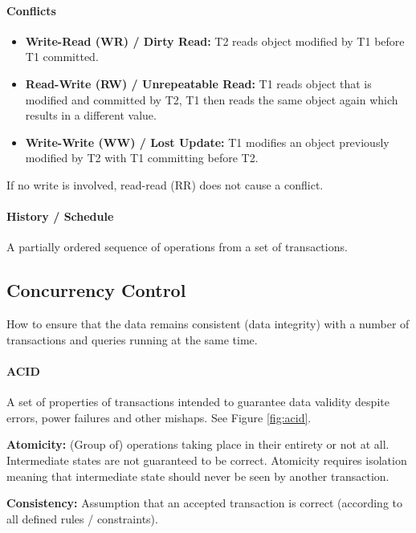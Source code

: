 
\paragraph{Conflicts}
\begin{itemize}
    \item \textbf{Write-Read (WR) / Dirty Read:} T2 reads object modified by T1 before T1 committed.
    \item \textbf{Read-Write (RW) / Unrepeatable Read:} T1 reads object that is modified and committed by T2, T1 then reads the same object again which results in a different value.
    \item \textbf{Write-Write (WW) / Lost Update:} T1 modifies an object previously modified by T2 with T1 committing before T2.
\end{itemize} 
If no write is involved, read-read (RR) does not cause a conflict.


\paragraph{History / Schedule} %
A partially ordered sequence of operations from a set of transactions. 



\subsection{Concurrency Control}

How to ensure that the data remains consistent (data integrity) with a number of transactions and queries running at the same time.

\paragraph{ACID}
A set of properties of transactions intended to guarantee data validity despite errors, power failures and other mishaps. See Figure \ref{fig:acid}.

\textbf{Atomicity:} (Group of) operations taking place in their entirety or not at all. Intermediate states are not guaranteed to be correct. Atomicity requires isolation meaning that intermediate state should never be seen by another transaction.

\textbf{Consistency:} Assumption that an accepted transaction is correct (according to all defined rules / constraints).

